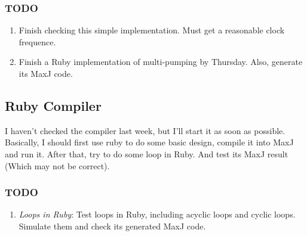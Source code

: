 \subsubsection{TODO}
\begin{enumerate}
\item Finish checking this simple implementation. Must get a reasonable clock frequence.
\item Finish a Ruby implementation of multi-pumping by Thursday. Also, generate its MaxJ code.
\end{enumerate}

\subsection{Ruby Compiler}

I haven't checked the compiler last week, but I'll start it as soon as possible. Basically, I should first use ruby to do some basic design, compile it into MaxJ and run it. After that, try to do some loop in Ruby. And test its MaxJ result (Which may not be correct).

\subsubsection{TODO}
\begin{enumerate}
\item \textit{Loops in Ruby}: Test loops in Ruby, including acyclic loops and cyclic loops. Simulate them and check its generated MaxJ code.
\end{enumerate}



